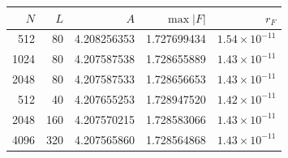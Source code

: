 \begin{tabular}{rrrrr}
\toprule
$N$ & $L$ & $A$ & $\max|F|$ & $r_F$ \\
\midrule
512 & 80 & 4.208256353 & 1.727699434 & $1.54\times10^{-11}$ \\
1024 & 80 & 4.207587538 & 1.728655889 & $1.43\times10^{-11}$ \\
2048 & 80 & 4.207587533 & 1.728656653 & $1.43\times10^{-11}$ \\
512 & 40 & 4.207655253 & 1.728947520 & $1.42\times10^{-11}$ \\
2048 & 160 & 4.207570215 & 1.728583066 & $1.43\times10^{-11}$ \\
4096 & 320 & 4.207565860 & 1.728564868 & $1.43\times10^{-11}$ \\
\bottomrule
\end{tabular}
